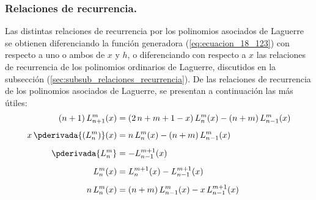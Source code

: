 \subsubsection{Relaciones de recurrencia.}

Las distintas relaciones de recurrencia por los polinomios asociados de Laguerre se obtienen diferenciando la función generadora (\ref{eq:ecuacion_18_123}) con respecto a uno o ambos de $x$ y $h$, o diferenciando con respecto a $x$ las relaciones de recurrencia de los polinomios ordinarios de Laguerre, discutidos en la subsección (\ref{sec:subsub_relaciones_recurrencia}). De las relaciones de recurrencia de los polinomios asociados de Laguerre, se presentan a continuación las más útiles:
\begin{align}
(n + 1) \, L_{n+1}^{m} (x) &= (2 \, n + m + 1 - x) \, L_{n}^{m} (x) - (n + m) \, L_{n-1}^{m} (x) \label{eq:ecuacion_18_124} \\[0.5em]
x \, \pderivada{(L_{n}^{m})} (x) &= n \, L_{n}^{m} (x) - (n + m) \, L_{n-1}^{m} (x) \label{eq:ecuacion_18_125} \\[0.5em]
\pderivada{L_{n}^{m}} &= - L_{n-1}^{m+1} (x) \label{eq:ecuacion_18_125a} \\[0.5em]
L_{n}^{m} (x) &= L_{n}^{m+1} (x) - L_{n-1}^{m+1} (x) \label{eq:ecuacion_18_125b} \\[0.5em]
n \, L_{n}^{m} (x) &= (n + m) \, L_{n-1}^{m} (x) - x \, L_{n-1}^{m+1} (x) \label{eq:ecuacion_18_125c}
\end{align}





